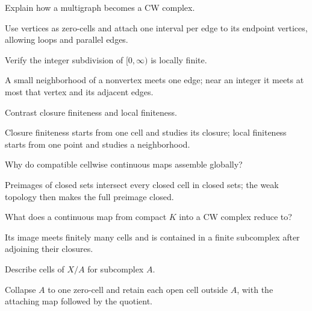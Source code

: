 \begin{problem}\label{prob:viii06-10}
Explain how a multigraph becomes a CW complex.
\end{problem}
\begin{solution}
Use vertices as zero-cells and attach one interval per edge to its endpoint vertices, allowing loops and parallel edges.
\end{solution}

\begin{problem}\label{prob:viii06-11}
Verify the integer subdivision of \([0,\infty)\) is locally finite.
\end{problem}
\begin{solution}
A small neighborhood of a nonvertex meets one edge; near an integer it meets at most that vertex and its adjacent edges.
\end{solution}

\begin{problem}\label{prob:viii06-12}
Contrast closure finiteness and local finiteness.
\end{problem}
\begin{solution}
Closure finiteness starts from one cell and studies its closure; local finiteness starts from one point and studies a neighborhood.
\end{solution}

\begin{problem}\label{prob:viii06-13}
Why do compatible cellwise continuous maps assemble globally?
\end{problem}
\begin{solution}
Preimages of closed sets intersect every closed cell in closed sets; the weak topology then makes the full preimage closed.
\end{solution}

\begin{problem}\label{prob:viii06-14}
What does a continuous map from compact \(K\) into a CW complex reduce to?
\end{problem}
\begin{solution}
Its image meets finitely many cells and is contained in a finite subcomplex after adjoining their closures.
\end{solution}

\begin{problem}[CW quotient]\label{prob:viii06-15}
Describe cells of \(X/A\) for subcomplex \(A\).
\end{problem}
\begin{solution}
Collapse \(A\) to one zero-cell and retain each open cell outside \(A\), with the attaching map followed by the quotient.
\end{solution}

